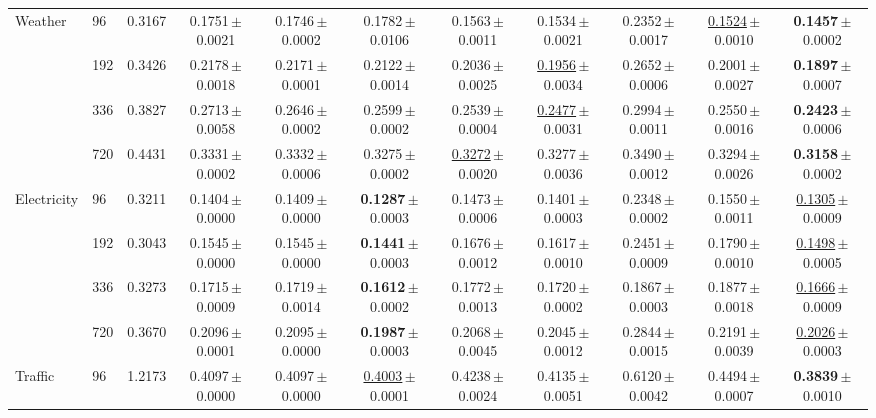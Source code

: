 \begin{tabular}{llccccccccc}
\midrule
\multirow{4}{*}{Weather} & 96 & 0.3167 & 0.1751\,{\tiny$\pm$0.0021} & 0.1746\,{\tiny$\pm$0.0002} & 0.1782\,{\tiny$\pm$0.0106} & 0.1563\,{\tiny$\pm$0.0011} & 0.1534\,{\tiny$\pm$0.0021} & 0.2352\,{\tiny$\pm$0.0017} & \underline{0.1524}\,{\tiny$\pm$0.0010} & \textbf{0.1457}\,{\tiny$\pm$0.0002} \\
 & 192 & 0.3426 & 0.2178\,{\tiny$\pm$0.0018} & 0.2171\,{\tiny$\pm$0.0001} & 0.2122\,{\tiny$\pm$0.0014} & 0.2036\,{\tiny$\pm$0.0025} & \underline{0.1956}\,{\tiny$\pm$0.0034} & 0.2652\,{\tiny$\pm$0.0006} & 0.2001\,{\tiny$\pm$0.0027} & \textbf{0.1897}\,{\tiny$\pm$0.0007} \\
 & 336 & 0.3827 & 0.2713\,{\tiny$\pm$0.0058} & 0.2646\,{\tiny$\pm$0.0002} & 0.2599\,{\tiny$\pm$0.0002} & 0.2539\,{\tiny$\pm$0.0004} & \underline{0.2477}\,{\tiny$\pm$0.0031} & 0.2994\,{\tiny$\pm$0.0011} & 0.2550\,{\tiny$\pm$0.0016} & \textbf{0.2423}\,{\tiny$\pm$0.0006} \\
 & 720 & 0.4431 & 0.3331\,{\tiny$\pm$0.0002} & 0.3332\,{\tiny$\pm$0.0006} & 0.3275\,{\tiny$\pm$0.0002} & \underline{0.3272}\,{\tiny$\pm$0.0020} & 0.3277\,{\tiny$\pm$0.0036} & 0.3490\,{\tiny$\pm$0.0012} & 0.3294\,{\tiny$\pm$0.0026} & \textbf{0.3158}\,{\tiny$\pm$0.0002} \\
\midrule
\multirow{4}{*}{Electricity} & 96 & 0.3211 & 0.1404\,{\tiny$\pm$0.0000} & 0.1409\,{\tiny$\pm$0.0000} & \textbf{0.1287}\,{\tiny$\pm$0.0003} & 0.1473\,{\tiny$\pm$0.0006} & 0.1401\,{\tiny$\pm$0.0003} & 0.2348\,{\tiny$\pm$0.0002} & 0.1550\,{\tiny$\pm$0.0011} & \underline{0.1305}\,{\tiny$\pm$0.0009} \\
 & 192 & 0.3043 & 0.1545\,{\tiny$\pm$0.0000} & 0.1545\,{\tiny$\pm$0.0000} & \textbf{0.1441}\,{\tiny$\pm$0.0003} & 0.1676\,{\tiny$\pm$0.0012} & 0.1617\,{\tiny$\pm$0.0010} & 0.2451\,{\tiny$\pm$0.0009} & 0.1790\,{\tiny$\pm$0.0010} & \underline{0.1498}\,{\tiny$\pm$0.0005} \\
 & 336 & 0.3273 & 0.1715\,{\tiny$\pm$0.0009} & 0.1719\,{\tiny$\pm$0.0014} & \textbf{0.1612}\,{\tiny$\pm$0.0002} & 0.1772\,{\tiny$\pm$0.0013} & 0.1720\,{\tiny$\pm$0.0002} & 0.1867\,{\tiny$\pm$0.0003} & 0.1877\,{\tiny$\pm$0.0018} & \underline{0.1666}\,{\tiny$\pm$0.0009} \\
 & 720 & 0.3670 & 0.2096\,{\tiny$\pm$0.0001} & 0.2095\,{\tiny$\pm$0.0000} & \textbf{0.1987}\,{\tiny$\pm$0.0003} & 0.2068\,{\tiny$\pm$0.0045} & 0.2045\,{\tiny$\pm$0.0012} & 0.2844\,{\tiny$\pm$0.0015} & 0.2191\,{\tiny$\pm$0.0039} & \underline{0.2026}\,{\tiny$\pm$0.0003} \\
\midrule
\multirow{4}{*}{Traffic} & 96 & 1.2173 & 0.4097\,{\tiny$\pm$0.0000} & 0.4097\,{\tiny$\pm$0.0000} & \underline{0.4003}\,{\tiny$\pm$0.0001} & 0.4238\,{\tiny$\pm$0.0024} & 0.4135\,{\tiny$\pm$0.0051} & 0.6120\,{\tiny$\pm$0.0042} & 0.4494\,{\tiny$\pm$0.0007} & \textbf{0.3839}\,{\tiny$\pm$0.0010} \\

\end{tabular}
